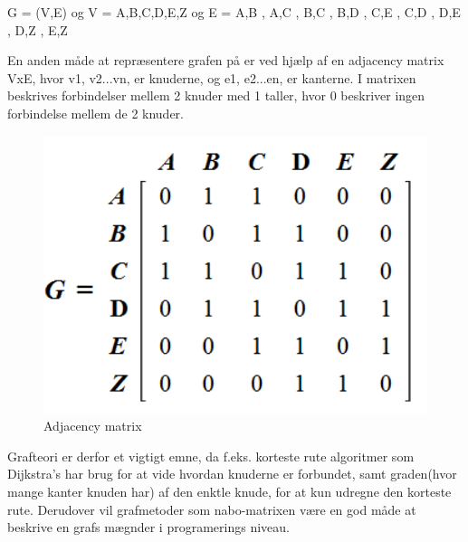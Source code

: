 G = (V,E) og V = {A,B,C,D,E,Z} og E = { {A,B} , {A,C} , {B,C} , {B,D} , {C,E} , {C,D} , {D,E} , {D,Z} , {E,Z} }

\vspace{5mm}

En anden måde at repræsentere grafen på er ved hjælp af en adjacency matrix VxE, hvor v1, v2...vn, er knuderne, og e1, e2...en, er kanterne. I matrixen beskrives forbindelser mellem 2 knuder med 1 taller, hvor 0 beskriver ingen forbindelse mellem de 2 knuder.


\begin{figure}[H]
\begin{adjustbox}{width=1.2\textwidth,center=\textwidth}
\centering
\includegraphics[width=1.2\textwidth]{Pictures/Teoriafsnit/Figurfiler/Grafteori_matrix.png}
\end{adjustbox}
\caption{Adjacency matrix}
\label{fig:grafteori}
\end{figure}


Grafteori er derfor et vigtigt emne, da f.eks. korteste rute algoritmer som Dijkstra's har brug for at vide hvordan knuderne er forbundet, samt graden(hvor mange kanter knuden har) af den enktle knude, for at kun udregne den korteste rute. Derudover vil grafmetoder som nabo-matrixen være en god måde at beskrive en grafs mægnder i programerings niveau. 



